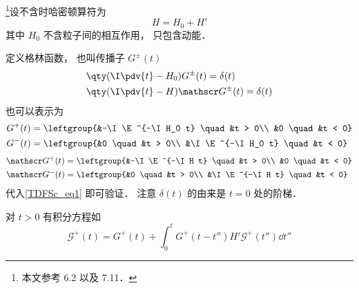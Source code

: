 
\footnote{本文参考 \cite{Newton} 6.2 以及 \cite{Sakurai} 7.11．}设不含时哈密顿算符为
\begin{equation}
H = H_0 + H'
\end{equation}
其中 $H_0$ 不含粒子间的相互作用， 只包含动能．

定义格林函数， 也叫传播子 $G^\pm(t)$
\begin{equation}\label{TDFSc_eq1}
\begin{aligned}
&\qty(\I\pdv{t} - H_0)G^\pm (t) = \delta(t)\\
&\qty(\I\pdv{t} - H)\mathscr G^\pm (t) = \delta(t)
\end{aligned}
\end{equation}
也可以表示为
\begin{equation}
\begin{aligned}
&G^+(t) = \leftgroup{&-\I \E^{-\I H_0 t} \quad &t > 0\\
&0 \quad &t < 0}\\
&G^-(t) = \leftgroup{&0 \quad &t > 0\\
&\I \E^{-\I H_0 t} \quad &t < 0}
\end{aligned}
\end{equation}
\begin{equation}
\begin{aligned}
&\mathscr G^+(t) = \leftgroup{&-\I \E^{-\I H t} \quad &t > 0\\
&0 \quad &t < 0}\\
&\mathscr G^-(t) = \leftgroup{&0 \quad &t > 0\\
&\I \E^{-\I H t} \quad &t < 0}
\end{aligned}
\end{equation}
代入\autoref{TDFSc_eq1} 即可验证． 注意 $\delta(t)$ 的由来是 $t=0$ 处的阶梯．

对 $t>0$ 有积分方程如
\begin{equation}
\mathscr G^+(t) = G^+(t) + \int_0^t G^+(t-t'')H'\mathscr G^+(t'')\dd{t''}
\end{equation}
